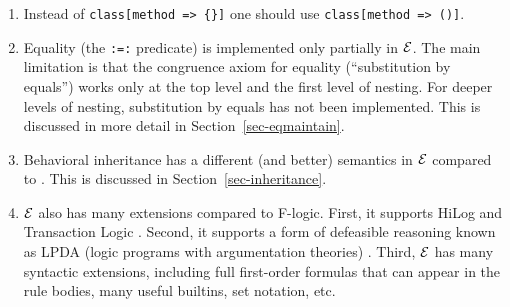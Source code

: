 \documentclass[11pt]{article}
\newcommand{\ERGO}{\mbox{\ensuremath{\cal{E}}\smaller{{\sc{RGO}}}}\xspace}
\newcommand{\FLSYSTEM}{\ERGO}
\begin{document}
\begin{enumerate}
  The semantics of this new type of formulas can be
  characterized by the following logical entailments ($\phi \models \psi$
  means $\phi$ logically entails $\psi$):
  \begin{quote}
    {\tt X[|M => T|], Y::X $\models$ Y[|M => T|]}\\
    {\tt X[|M => T|], Y:X $\models$ Y[M => T]}
  \end{quote}
\item Instead of {\tt class[method => \{\}]}
  one should use {\tt class[method => ()]}.
\item Equality (the {\tt :=:} predicate) is implemented only partially in
  \FLSYSTEM. The main limitation is that the congruence axiom for equality
  (``substitution by equals'') works only at the top level and the first
  level of nesting.  For deeper levels of nesting, substitution by equals
  has not been implemented. This is discussed in more detail in
  Section~\ref{sec-eqmaintain}.
\item Behavioral inheritance has a different (and better) semantics in
  \FLSYSTEM compared to \cite{KLW95}.
  This is discussed in Section~\ref{sec-inheritance}.
\item \FLSYSTEM also has many extensions compared to F-logic. First, it
  supports HiLog \cite{hilog-jlp,hilog-icdt-95} and Transaction Logic
  \cite{trans-iclp93,trans-tcs94,trans-chapter-98}.
  Second, it supports a form of defeasible reasoning known as LPDA (logic
  programs with argumentation theories) \cite{lpda-iclp-09}. Third,
  \FLSYSTEM has many syntactic extensions, including full first-order
  formulas that can appear in the rule bodies, many useful builtins, set
  notation, etc.
\end{enumerate}

\newpage



\printindex
\end{document}
